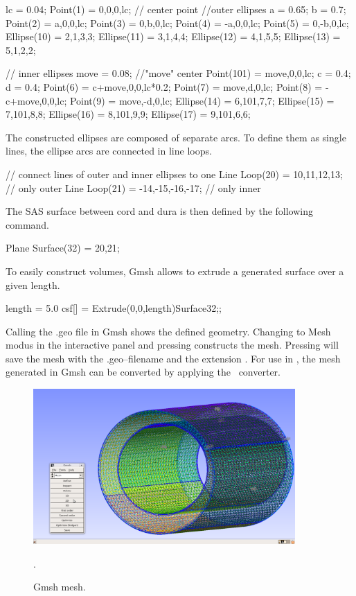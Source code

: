 \begin{code}
lc = 0.04;
Point(1) = {0,0,0,lc};	// center point
//outer ellipses
a = 0.65;
b = 0.7;
Point(2) = {a,0,0,lc};
Point(3) = {0,b,0,lc};
Point(4) = {-a,0,0,lc};
Point(5) = {0,-b,0,lc};
Ellipse(10) = {2,1,3,3};
Ellipse(11) = {3,1,4,4};
Ellipse(12) = {4,1,5,5};
Ellipse(13) = {5,1,2,2};

// inner ellipses
move = 0.08; //"move" center
Point(101) = {move,0,0,lc};
c = 0.4;
d = 0.4;
Point(6) = {c+move,0,0,lc*0.2};
Point(7) = {move,d,0,lc};
Point(8) = {-c+move,0,0,lc};
Point(9) = {move,-d,0,lc};
Ellipse(14) = {6,101,7,7};
Ellipse(15) = {7,101,8,8};
Ellipse(16) = {8,101,9,9};
Ellipse(17) = {9,101,6,6};
\end{code}

The constructed ellipses are composed of separate arcs. To define them as single lines, the ellipse arcs are connected in line loops.

\begin{code}
// connect lines of outer and inner ellipses to one
Line Loop(20) = {10,11,12,13};		// only outer
Line Loop(21) = {-14,-15,-16,-17};	// only inner
\end{code}
The SAS surface between cord and dura is then defined by the following command.
\begin{code}
Plane Surface(32) = {20,21};
\end{code}

To easily construct volumes, Gmsh allows to extrude a generated surface over a given length.
\begin{code}
length = 5.0
csf[] = Extrude(0,0,length){Surface{32};};
\end{code}


Calling the .geo file in Gmsh
shows the defined geometry. Changing to Mesh modus in the interactive panel and pressing  constructs the mesh. Pressing  will save the mesh with the .geo--filename and the extension . For use in \dolfin, the mesh generated in Gmsh can be converted by applying the \dolfin\ converter.\\



\begin{figure}\begin{center}
\includegraphics[width=100mm]{chapters/hentschel/pdf/gmsh.pdf}
\caption{Gmsh mesh.}
\label{fig:Gmsh_mesh}.
\end{center}\end{figure}

